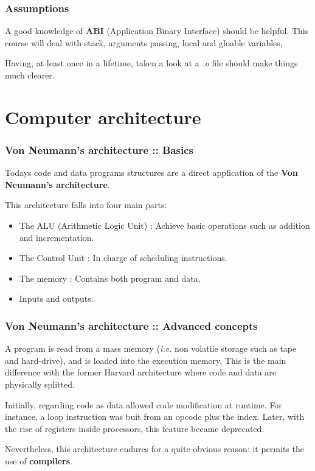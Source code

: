 
\begin{frame}
  \frametitle{Assumptions}

  A good knowledge of \textbf{ABI} (Application Binary Interface) should be helpful. This
  course will deal with stack, arguments passing, local and gloable variables, 
\etc{}

  \-

  Having, at least once in a lifetime, taken a look at a \textit{.o} file should make things much
  clearer.

\end{frame}



%
%

\section{Computer architecture}


\begin{frame}
  \frametitle{Von Neumann's architecture :: Basics}

Todays code and data programs structures are a direct application of the \textbf{Von Neumann's architecture}.

\-

This architecture falls into four main parts:

  \begin{itemize}
    \item
      The ALU (Arithmetic Logic Unit) : Achieve basic operations such as addition and incrementation.
    \item
      The Control Unit : In charge of scheduling instructions.
    \item
      The memory : Contains both program and data.
    \item
      Inputs and outputs.
  \end{itemize}

\end{frame}


\begin{frame}
  \frametitle{Von Neumann's architecture :: Advanced concepts}

A program is read from a mass memory (\textit{i.e.} non volatile storage such as
tape and hard-drive), and is loaded into the execution memory. This is
the main difference with the former Harvard architecture where code and
data are physically splitted.

\-

Initially, regarding code as data allowed code modification at runtime. For
instance, a loop instruction was buit from an opcode plus the index. Later,
with the rise of registers inside processors, this feature became
deprecated.

\-

Nevertheless, this architecture endures for a quite obvious reason: it
permits the use of \textbf{compilers}.

\end{frame}

